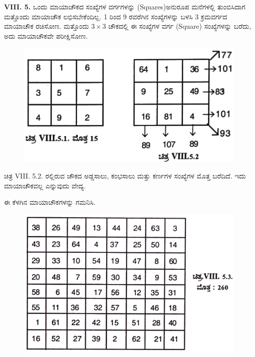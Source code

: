 \medskip
\noindent \textbf{VIII. 5.} ಒಂದು ಮಾಯಾಚೌಕದ ಸಂಖ್ಯೆಗಳ ವರ್ಗಗಳನ್ನು (Squares)ಅನುರೂಪ ಮನೆ\-ಗಳಲ್ಲಿ ತುಂಬಿಸಿದಾಗ ಮತ್ತೊಂದು ಮಾಯಾಚೌಕ ಲಭಿಸಬೇಕೆಂದಿಲ್ಲ. 1 ರಿಂದ 9 ರವರೆಗಿನ ಸಂಖ್ಯೆ\-ಗಳನ್ನು ಬಳಸಿ 3 ಕ್ರಮವರ್ಗದ ಮಾಯಾಚೌಕ ರಚಿಸೋಣ. ಮತ್ತೊಂದು $3 \times 3$ \break ಚೌಕದಲ್ಲಿ ಈ ಸಂಖ್ಯೆಗಳ ವರ್ಗ (Square) ಸಂಖ್ಯೆಗಳನ್ನು ಬರೆದು, ಅದು ಮಾಯಾಚೌಕವೇ ಪರೀಕ್ಷಿಸೋಣ.
\begin{figure}[H]
\includegraphics[scale=1.25]{src/figures/chap7/fig7-16.jpg}
\end{figure}

ಚಿತ್ರ VIII. 5.2. ರಲ್ಲಿರುವ ಚೌಕದ ಅಡ್ಡಸಾಲು, ಕಂಭಸಾಲು ಮತ್ತು ಕರ್ಣಗಳ ಸಂಖ್ಯೆಗಳ ಮೊತ್ತ ಬರೆದಿದೆ. ಇದು ಮಾಯಾಚೌಕವಲ್ಲ ಎನ್ನುವುದು ವೇದ್ಯ.
\eject

ಈ ಕೆಳಗಿನ ಮಾಯಾಚೌಕಗಳನ್ನು ಗಮನಿಸಿ.
\begin{figure}[H]
\includegraphics{src/figures/chap7/fig7-17.jpg}
\end{figure}

